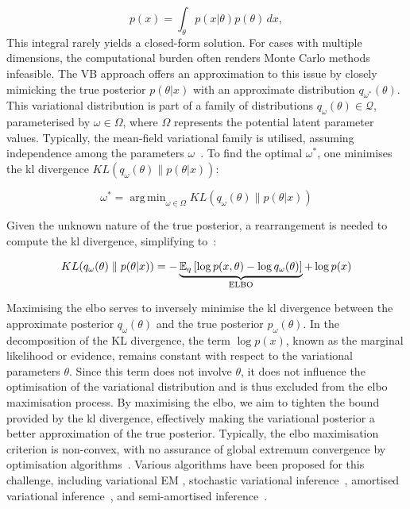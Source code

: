 \documentclass[3p,review,authoryear]{elsarticle}
\DeclareMathOperator*{\argmin}{arg\,min}
\begin{document}
\begin{equation}
p(x)=\int_{\theta} p(x|\theta)p(\theta) \,dx,
\label{eq:evidence}
\end{equation}
This integral rarely yields a closed-form solution.
For cases with multiple dimensions, the computational burden often renders Monte Carlo methods infeasible.
The VB approach offers an approximation to this issue by closely mimicking the true posterior $p(\theta|x)$ with an approximate distribution $q_{\omega^*}(\theta)$. This variational distribution is part of a family of distributions $q_\omega(\theta)\in \mathcal{Q}$, parameterised by $\omega \in \Omega$, where $\Omega$ represents the potential latent parameter values.
Typically, the mean-field variational family is utilised, assuming independence among the parameters $\omega$~\citep{Blei_2017}. 
To find the optimal $\omega^*$, one minimises the \gls{kl} divergence $KL(q_\omega(\theta) \parallel p(\theta|x))$:

\begin{equation}
\omega^* = \argmin_{\omega \in \Omega}KL(q_\omega(\theta) \parallel p(\theta|x))
\label{eq:optim}
\end{equation}

Given the unknown nature of the true posterior, a rearrangement is needed to compute the \gls{kl} divergence, simplifying to~\citep[Chapter~10]{murphy2023probabilistic}:

\begin{equation}
KL(q_\omega(\theta) \parallel p(\theta|x)) = -\underbrace{\mathbb{E}_q\left[\log p(x,\theta) - \log q_\omega(\theta)\right]}_{\text{ELBO}}+ \log p(x)\\
\label{eq:kl_divergence}
\end{equation}

Maximising the \gls{elbo} serves to inversely minimise the \gls{kl} divergence between the approximate posterior \(q_\omega(\theta)\) and the true posterior \(p_\omega(\theta)\).
In the decomposition of the KL divergence, the term \(\log p(x)\), known as the marginal likelihood or evidence, remains constant with respect to the variational parameters \(\theta\).
Since this term does not involve \(\theta\), it does not influence the optimisation of the variational distribution and is thus excluded from the \gls{elbo} maximisation process.
By maximising the \gls{elbo}, we aim to tighten the bound provided by the \gls{kl} divergence, effectively making the variational posterior a better approximation of the true posterior.
Typically, the \gls{elbo} maximisation criterion is non-convex, with no assurance of global extremum convergence by optimisation algorithms~\citep[Chapter~10]{murphy2023probabilistic}.
Various algorithms have been proposed for this challenge, including variational EM \citep{bernardo2003variational}, stochastic variational inference~\citep{hoffman2013stochastic, sashank2018convergence}, amortised variational inference~\citep{gershman2014amortized, le2017inference}, and semi-amortised inference~\citep{kim2018semi}.
\end{document}
